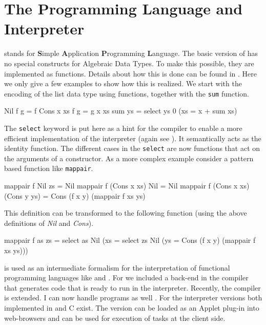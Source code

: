 \section{The \Sapl Programming Language and Interpreter}\label{sapljs:sec:sapl}
\Sapl stands for \textbf{S}imple \textbf{A}pplication \textbf{P}rogramming \textbf{L}anguage. The 
basic version of \Sapl has no special constructs for Algebraic Data Types. 
To make this possible, they are implemented as functions. 
Details about how this is done can be found in \cite{JKP}.
Here we only give a few examples to show how this is realized.
We start with the encoding of the list data type using functions, together with the \texttt{sum} function.
\begin{CleanCode}
Nil f g       = f
Cons x xs f g = g x xs
sum ys        = select ys 0 (\x xs = x + sum xs)
\end{CleanCode}
The \texttt{select} keyword is put here as a hint for the compiler to enable a 
more efficient implementation of the \Sapl interpreter (again see \cite{JKP}). 
It semantically acts as the identity function.
The different cases in the \texttt{select} are now functions that act on the arguments of a constructor.
As a more complex example consider a pattern based \Haskell function like \texttt{mappair}.  
\begin{CleanCode}
mappair f Nil          zs           = Nil 
mappair f (Cons x xs)  Nil          = Nil 
mappair f (Cons x xs)  (Cons y ys)  = Cons (f x y) (mappair f xs ys) 
\end{CleanCode}
This definition can be transformed to the following \Sapl function (using the above definitions of \emph{Nil} and \emph{Cons}).
\begin{CleanCode}
mappair f as zs 
= select as Nil (\x xs = select zs Nil (\y ys = Cons (f x y) (mappair f xs ys)))
\end{CleanCode}
%
\Sapl is used as an intermediate formalism for the interpretation of functional programming languages 
like \Haskell and \Clean.  For \Clean we included a \Sapl back-end in the \Clean compiler that 
generates \Sapl code that is ready to run in the \Sapl interpreter. 
Recently, the \Clean compiler is extended. I can now handle \Haskell programs as well \cite{HASCLEAN}.
For the \Sapl interpreter versions both implemented in \Java and \textsf{C} exist. The \Java
version can be loaded as an \Java Applet plug-in into web-browsers 
and can be used for execution of \iTask tasks at the client side.

